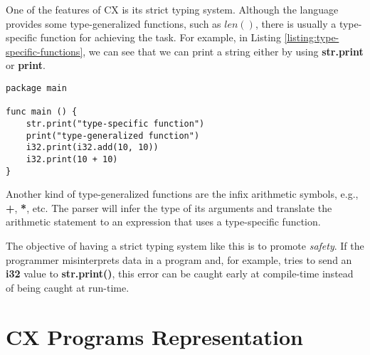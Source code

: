 \documentclass[11pt,fleqn,openany]{book} %
\begin{document}
One of the features of CX is its strict typing system. Although the language provides some type-generalized functions, such as $len()$, there is usually a type-specific function for achieving the task. For example, in Listing \ref{listing:type-specific-functions}, we can see that we can print a string either by using \textbf{str.print} or \textbf{print}.

\begin{lstlisting}[caption={Type-Specific Functions},captionpos=b,label={listing:type-specific-functions}]
package main

func main () {
 	str.print("type-specific function")
    print("type-generalized function")
    i32.print(i32.add(10, 10))
    i32.print(10 + 10)
}
\end{lstlisting}

Another kind of type-generalized functions are the infix arithmetic symbols, e.g., \textbf{+}, \textbf{*}, etc. The parser will infer the type of its arguments and translate the arithmetic statement to an expression that uses a type-specific function.

The objective of having a strict typing system like this is to promote \emph{safety}. If the programmer misinterprets data in a program and, for example, tries to send an \textbf{i32} value to \textbf{str.print()}, this error can be caught early at compile-time instead of being caught at run-time.


\chapter{CX Programs Representation}
\label{chapter:cx-programs-representation}
\end{document}
